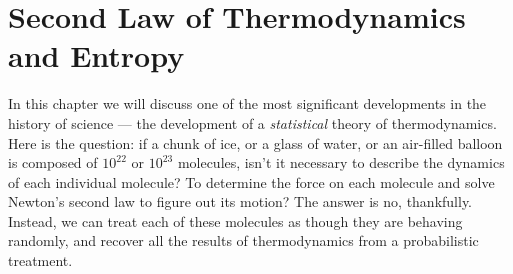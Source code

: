 \chapter[Second Law and Entropy]{Second Law of Thermodynamics and  Entropy}
\label{chapter:second_law}


%
%
%
%
%
%


In this chapter we will discuss one of the most significant
developments in the history of science --- the development of a {\em
  statistical} theory of thermodynamics.  Here is the question: if a
chunk of ice, or a glass of water, or an air-filled balloon is composed of
$10^{22}$ or $10^{23}$ molecules, isn't it necessary to describe the
dynamics of each individual molecule?  To determine the force on each
molecule and solve Newton's second law to figure out its motion?  The
answer is no, thankfully.  Instead, we can treat each of these
molecules as though they are behaving randomly, and recover all the
results of thermodynamics from a probabilistic treatment.


